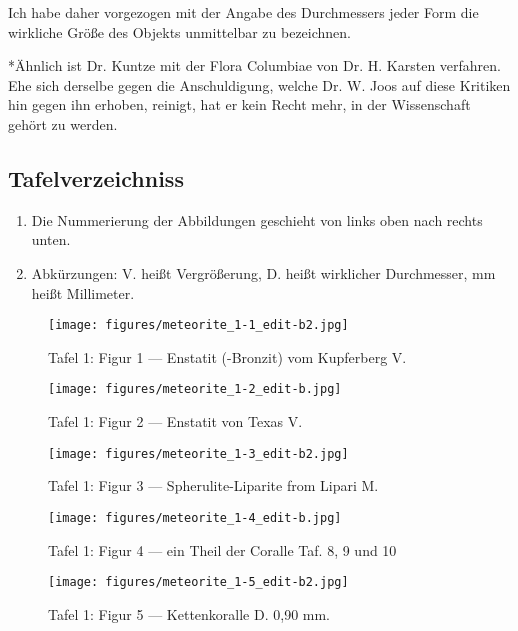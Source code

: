 \documentclass[a4paper, 12pt, oneside]{article}
\begin{document}
Ich habe daher vorgezogen mit der Angabe des Durchmessers jeder Form die wirkliche Größe des Objekts unmittelbar zu bezeichnen.

*Ähnlich ist Dr. Kuntze mit der Flora Columbiae von Dr. H. Karsten verfahren. Ehe sich derselbe gegen die Anschuldigung, welche Dr. W. Joos auf diese Kritiken hin gegen ihn erhoben, reinigt, hat er kein Recht mehr, in der Wissenschaft gehört zu werden.
\clearpage
\subsection{Tafelverzeichniss}
\begin{enumerate}
    \item Die Nummerierung der Abbildungen geschieht von links oben nach rechts unten.
    \item Abkürzungen: V. heißt Vergrößerung, D. heißt wirklicher Durchmesser, mm heißt Millimeter.
\end{enumerate}
\clearpage
\pagestyle{fancy}
\fancyhf{}
\cfoot{\thepage}
\begin{figure}[b]
\texttt{[image: figures/meteorite\_1-1\_edit-b2.jpg]}
\caption{Tafel 1: Figur 1 --- Enstatit (-Bronzit) vom Kupferberg V.}
\centering
\end{figure}
\clearpage
\begin{figure}[t]
\texttt{[image: figures/meteorite\_1-2\_edit-b.jpg]}
\caption{Tafel 1: Figur 2 --- Enstatit von Texas V.}
\centering
\end{figure}
\clearpage
\begin{figure}[t]
\texttt{[image: figures/meteorite\_1-3\_edit-b2.jpg]}
\caption{Tafel 1: Figur 3 --- Spherulite-Liparite from Lipari M.}
\centering
\end{figure}
\clearpage
\begin{figure}[t]
\texttt{[image: figures/meteorite\_1-4\_edit-b.jpg]}
\caption{Tafel 1: Figur 4 --- ein Theil der Coralle Taf. 8, 9 und 10}
\centering
\end{figure}
\clearpage
\begin{figure}[t]
\texttt{[image: figures/meteorite\_1-5\_edit-b2.jpg]}
\caption{Tafel 1: Figur 5 --- Kettenkoralle D. 0,90 mm.}
\centering
\end{figure}
\end{document}
